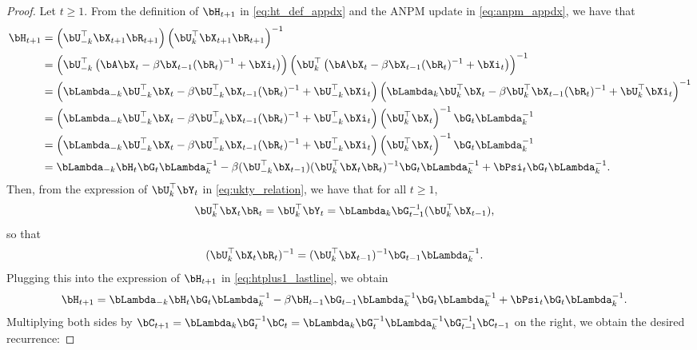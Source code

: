 \documentclass{article}
\theoremstyle{plain}
\theoremstyle{definition}
\theoremstyle{remark}
\begin{document}
\begin{proof}
  Let $t\geqslant 1$. From the definition of $\bH_{t+1}$ in \eqref{eq:ht_def_appdx} and the ANPM update in \eqref{eq:anpm_appdx}, we have that
  \begin{align}
    \bH_{t+1} &= \left(\bU_{-k}^\top\bX_{t+1}\bR_{t+1}\right) \left(\bU_{k}^\top\bX_{t+1}\bR_{t+1}\right)^{-1}  \nonumber\\
    &= \left(\bU_{-k}^\top\left( \bA\bX_t - \beta\bX_{t-1}(\bR_t)^{-1} + \bXi_t\right)\right) \left(\bU_{k}^\top\left( \bA\bX_t - \beta\bX_{t-1}(\bR_t)^{-1} + \bXi_t\right)\right)^{-1} \nonumber\\
    &= \left(\bLambda_{-k}\bU_{-k}^\top\bX_t - \beta\bU_{-k}^\top\bX_{t-1}(\bR_t)^{-1} + \bU_{-k}^\top\bXi_t\right)\left(\bLambda_{k}\bU_{k}^\top\bX_t - \beta\bU_{k}^\top\bX_{t-1}(\bR_t)^{-1} + \bU_{k}^\top\bXi_t\right)^{-1}\nonumber \\
    &= \left(\bLambda_{-k}\bU_{-k}^\top\bX_t - \beta\bU_{-k}^\top\bX_{t-1}(\bR_t)^{-1} + \bU_{-k}^\top\bXi_t\right) \left(\bU_k^\top\bX_t\right)^{-1}\bG_t\bLambda_k^{-1}\nonumber \\
    &= \left(\bLambda_{-k}\bU_{-k}^\top\bX_t - \beta\bU_{-k}^\top\bX_{t-1}(\bR_t)^{-1} + \bU_{-k}^\top\bXi_t\right) \left(\bU_k^\top\bX_t\right)^{-1}\bG_t\bLambda_k^{-1}\nonumber \\
    & = \bLambda_{-k} \bH_t \bG_t \bLambda_k^{-1} - \beta  (\bU_{-k}^\top\bX_{t-1})(\bU_k^\top\bX_t\bR_t)^{-1} \bG_t \bLambda_k^{-1} + \bPsi_t \bG_t \bLambda_k^{-1}\label{eq:htplus1_lastline}.
  \end{align}
  Then, from the expression of $\bU_k^\top\bY_t$ in \eqref{eq:ukty_relation}, we have that for all $t\geqslant 1$,
  \begin{align*}
    \bU_k^\top\bX_t\bR_t & = \bU_k^\top \bY_t = \bLambda_k \bG_{t-1}^{-1} (\bU_k^\top \bX_{t-1}),
  \end{align*}
  so that
  \begin{align*}
    (\bU_k^\top\bX_t\bR_t)^{-1} & = (\bU_k^\top \bX_{t-1})^{-1} \bG_{t-1} \bLambda_k^{-1}.
  \end{align*}
  Plugging this into the expression of $\bH_{t+1}$ in \eqref{eq:htplus1_lastline}, we obtain
  \begin{align*}
    \bH_{t+1} & = \bLambda_{-k} \bH_t \bG_t \bLambda_k^{-1} - \beta \bH_{t-1} \bG_{t-1} \bLambda_k^{-1} \bG_t \bLambda_k^{-1} + \bPsi_t \bG_t \bLambda_k^{-1}.
  \end{align*}
  Multiplying both sides by $\bC_{t+1} = \bLambda_k \bG_t^{-1} \bC_t = \bLambda_k\bG_t^{-1}\bLambda_k^{-1}\bG_{t-1}^{-1}\bC_{t-1}$ on the right, we obtain the desired recurrence:

\end{proof}
\end{document}
